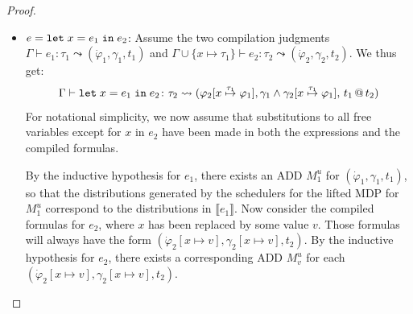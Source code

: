 \begin{proof}
\begin{itemize}
		
		\item $e = \texttt{let}\; x = e_1 \;\texttt{in}\; e_2$:
		Assume the two compilation judgments $\Gamma \vdash e_1 \colon \tau_1 \leadsto (\dot{\varphi}_1, \gamma_1, t_1)$ and $\Gamma \cup \{x \mapsto \tau_1 \} \vdash e_2 \colon \tau_2 \leadsto (\dot{\varphi}_2, \gamma_2, t_2)$. 
		We thus get: 
		$$\Gamma \vdash\texttt{let}\; x = e_1 \;\texttt{in}\; e_2 \colon \tau_2 \leadsto (
		\varphi_2[x\overset{\tau_1}{\mapsto} \varphi_1], 
		\gamma_1 \land \gamma_2[x\overset{\tau_1}{\mapsto} \varphi_1],\, 
		t_1 \,@\, t_2)$$
		For notational simplicity, we now assume that substitutions to all free variables except for $x$ in $e_2$ have been made in both the expressions and the compiled formulas.
		
		By the inductive hypothesis for $e_1$, there exists an ADD $M^u_1$ for $(\dot{\varphi}_1, \gamma_1, t_1)$, so that the distributions generated by the schedulers for the lifted MDP for $M^u_1$ correspond to the distributions in $\llbracket e_1 \rrbracket$.
		Now consider the compiled formulas for $e_2$, where $x$ has been replaced by some value $v$.
		Those formulas will always have the form $(\dot{\varphi}_2[x \mapsto v], \gamma_2[x \mapsto v], t_2)$.
		By the inductive hypothesis for $e_2$, there exists a corresponding ADD $M^u_v$ for each $(\dot{\varphi}_2[x \mapsto v], \gamma_2[x \mapsto v], t_2)$.
		

\end{itemize}
\end{proof}
